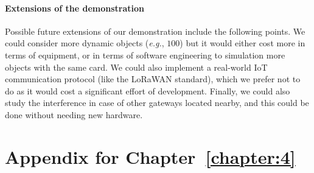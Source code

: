\paragraph{Extensions of the demonstration}
Possible future extensions of our demonstration include the following points.
We could consider more dynamic objects (\emph{e.g.}, $100$) but it would either cost more in terms of equipment, or in terms of software engineering to simulation more objects with the same card.
We could also implement a real-world IoT communication protocol (like the LoRaWAN standard), which we prefer not to do as it would cost a significant effort of development.
Finally, we could also study the interference in case of other gateways located nearby, and this could be done without needing new hardware.
%


\section{Appendix for Chapter~\ref{chapter:4}}
\label{sec:4:appendix}


